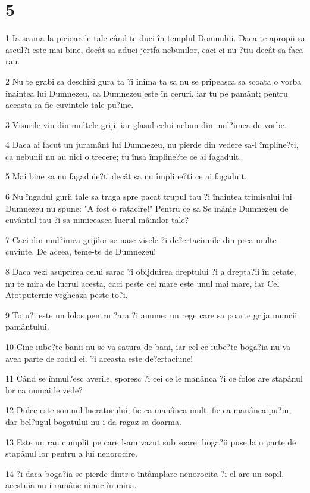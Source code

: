 \chapter{5}

\par 1 Ia seama la picioarele tale când te duci în templul Domnului. Daca te apropii sa ascul?i este mai bine, decât sa aduci jertfa nebunilor, caci ei nu ?tiu decât sa faca rau.
\par 2 Nu te grabi sa deschizi gura ta ?i inima ta sa nu se pripeasca sa scoata o vorba înaintea lui Dumnezeu, ca Dumnezeu este în ceruri, iar tu pe pamânt; pentru aceasta sa fie cuvintele tale pu?ine.
\par 3 Visurile vin din multele griji, iar glasul celui nebun din mul?imea de vorbe.
\par 4 Daca ai facut un juramânt lui Dumnezeu, nu pierde din vedere sa-l împline?ti, ca nebunii nu au nici o trecere; tu însa împline?te ce ai fagaduit.
\par 5 Mai bine sa nu fagaduie?ti decât sa nu împline?ti ce ai fagaduit.
\par 6 Nu îngadui gurii tale sa traga spre pacat trupul tau ?i înaintea trimisului lui Dumnezeu nu spune: "A fost o ratacire!" Pentru ce sa Se mânie Dumnezeu de cuvântul tau ?i sa nimiceasca lucrul mâinilor tale?
\par 7 Caci din mul?imea grijilor se nasc visele ?i de?ertaciunile din prea multe cuvinte. De aceea, teme-te de Dumnezeu!
\par 8 Daca vezi asuprirea celui sarac ?i obijduirea dreptului ?i a drepta?ii în cetate, nu te mira de lucrul acesta, caci peste cel mare este unul mai mare, iar Cel Atotputernic vegheaza peste to?i.
\par 9 Totu?i este un folos pentru ?ara ?i anume: un rege care sa poarte grija muncii pamântului.
\par 10 Cine iube?te banii nu se va satura de bani, iar cel ce iube?te boga?ia nu va avea parte de rodul ei. ?i aceasta este de?ertaciune!
\par 11 Când se înmul?esc averile, sporesc ?i cei ce le manânca ?i ce folos are stapânul lor ca numai le vede?
\par 12 Dulce este somnul lucratorului, fie ca manânca mult, fie ca manânca pu?in, dar bel?ugul bogatului nu-i da ragaz sa doarma.
\par 13 Este un rau cumplit pe care l-am vazut sub soare: boga?ii puse la o parte de stapânul lor pentru a lui nenorocire.
\par 14 ?i daca boga?ia se pierde dintr-o întâmplare nenorocita ?i el are un copil, acestuia nu-i ramâne nimic în mina.
